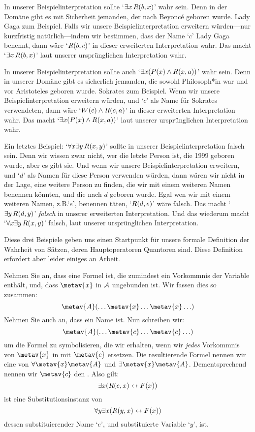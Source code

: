 In unserer Beispielinterpretation sollte `$\exists x\, \mathord{R}(b,x)$' wahr sein. Denn in der Domäne gibt es mit Sicherheit jemanden, der nach Beyonc\'e geboren wurde. Lady Gaga zum Beispiel. Falls wir unsere Beispielinterpretation erweitern würden---nur kurzfristig natürlich---indem wir bestimmen, dass der Name `$c$' Lady Gaga benennt, dann wäre `$\mathord{R}(b,c)$' in dieser erweiterten Interpretation wahr. Das macht `$\exists x\, \mathord{R}(b,x)$' laut unserer ursprünglichen Interpretation wahr.

In unserer Beispielinterpretation sollte auch `$\exists x (\mathord{P}(x) \wedge \mathord{R}(x,a))$' wahr sein. Denn in unserer Domäne gibt es sicherlich jemanden, die sowohl Philosoph*in war und vor Aristoteles geboren wurde. Sokrates zum Beispiel. Wenn wir unsere Beispielinterpretation erweitern würden, und `$c$' als Name für Sokrates verwendeten, dann wäre `$\mathord{W}(c) \wedge \mathord{R}(c,a)$' in dieser erweiterten Interpretation wahr. Das macht `$\exists x (\mathord{P}(x) \wedge \mathord{R}(x,a))$' laut unserer ursprünglichen Interpretation wahr. 

Ein letztes Beispiel: `$\forall x \exists y\, \mathord{R}(x,y)$' sollte in unserer Beispielinterpretation falsch sein. Denn wir wissen zwar nicht, wer die letzte Person ist, die 1999 geboren wurde, aber es gibt sie. Und wenn wir unsere Beispielinterpretation erweitern, und `$d$' als Namen für diese Person verwenden würden, dann wären wir nicht in der Lage, eine weitere Person zu finden, die wir mit einem weiteren Namen benennen könnten, und die nach $d$ geboren wurde. Egal wen wir mit einem weiteren Namen, z.B.\@ `$e$', benennen täten, `$\mathord{R}(d,e)$' wäre falsch. Das macht `$\exists y\, \mathord{R}(d,y)$' \emph{falsch} in unserer erweiterten Interpretation. Und das wiederum macht `$\forall x \exists y\, \mathord{R}(x,y)$' falsch, laut unserer ursprünglichen Interpretation.

Diese drei Beispiele geben uns einen Startpunkt für unsere formale Definition der Wahrheit von Sätzen, deren Hauptoperatoren Quantoren sind. Diese Definition erfordert aber leider einiges an Arbeit.

Nehmen Sie an, dass  eine Formel ist, die zumindest ein Vorkommnis der Variable  enthält, und, dass $\metav{x}$ in $\mathcal{A}$ ungebunden ist. Wir fassen dies so zusammen:
$$\metav{A}(\ldots \metav{x} \ldots \metav{x} \ldots)$$
Nehmen Sie auch an, dass  ein Name ist. Nun schreiben wir:
$$\metav{A}(\ldots \metav{c} \ldots \metav{c} \ldots)$$
um die Formel zu symbolisieren, die wir erhalten, wenn wir \emph{jedes} Vorkommnis von $\metav{x}$ in  mit $\metav{c}$ ersetzen. Die resultierende Formel nennen wir eine  von $\forall \metav{x}\metav{A}$ und $\exists\metav{x}\metav{A}$. Dementsprechend nennen wir $\metav{c}$ den . Also gilt:
	$$\exists x (\mathord{R}(e,x) \leftrightarrow \mathord{F}(x))$$
ist eine Substitutionsinstanz von 
	$$\forall y \exists x (\mathord{R}(y,x) \leftrightarrow \mathord{F}(x))$$
dessen substituierender Name `$e$', und substituierte Variable `$y$', ist.

